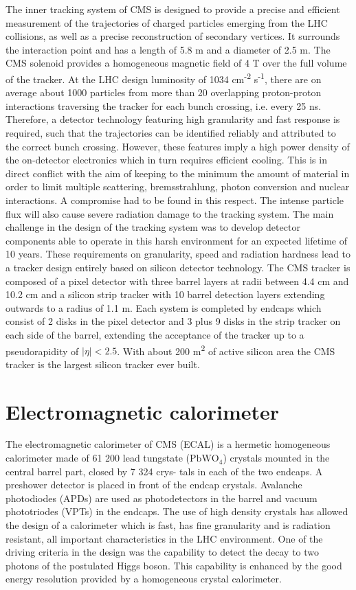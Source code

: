 The inner tracking system of CMS is designed to provide a precise and efficient measurement
of the trajectories of charged particles emerging from the LHC collisions, as well as a precise
reconstruction of secondary vertices. It surrounds the interaction point and has a length of 5.8 m
and a diameter of 2.5 m. The CMS solenoid provides a homogeneous magnetic field of 4 T over
the full volume of the tracker.
At the LHC design luminosity of 1034 cm\textsuperscript{-2} s\textsuperscript{-1},
there are on average about 1000 particles from more than 20 overlapping proton-proton interactions traversing
the tracker for each bunch crossing, i.e. every 25 ns. Therefore, a detector technology featuring high
granularity and fast response is required, such that the trajectories can be identified reliably and
attributed to the correct bunch crossing. However, these features imply a high power density of
the on-detector electronics which in turn requires efficient cooling. This is in direct conflict with
the aim of keeping to the minimum the amount of material in order to limit multiple scattering,
bremsstrahlung, photon conversion and nuclear interactions. A compromise had to be found in this
respect. The intense particle flux will also cause severe radiation damage to the tracking system.
The main challenge in the design of the tracking system was to develop detector components able
to operate in this harsh environment for an expected lifetime of 10 years. These requirements on
granularity, speed and radiation hardness lead to a tracker design entirely based on silicon detector
technology. The CMS tracker is composed of a pixel detector with three barrel layers at radii
between 4.4 cm and 10.2 cm and a silicon strip tracker with 10 barrel detection layers extending
outwards to a radius of 1.1 m. Each system is completed by endcaps which consist of 2 disks in
the pixel detector and 3 plus 9 disks in the strip tracker on each side of the barrel, extending the
acceptance of the tracker up to a pseudorapidity of $|\eta| < 2.5$. With about 200 m\textsuperscript{2} of active silicon
area the CMS tracker is the largest silicon tracker ever built.

\section{Electromagnetic calorimeter}
The electromagnetic calorimeter of CMS (ECAL) is a hermetic homogeneous calorimeter made of
61 200 lead tungstate ($\textrm{PbWO}_{\textrm{4}}$) crystals mounted in the central barrel part, closed by 7 324 crys-
tals in each of the two endcaps. A preshower detector is placed in front of the endcap crystals.
Avalanche photodiodes (APDs) are used as photodetectors in the barrel and vacuum phototriodes
(VPTs) in the endcaps. The use of high density crystals has allowed the design of a calorimeter
which is fast, has fine granularity and is radiation resistant, all important characteristics in the LHC
environment. One of the driving criteria in the design was the capability to detect the decay to two
photons of the postulated Higgs boson. This capability is enhanced by the good energy resolution
provided by a homogeneous crystal calorimeter.

